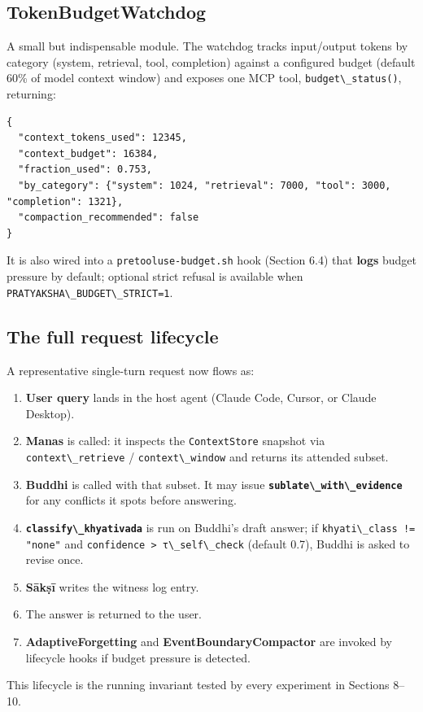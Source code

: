 \subsection{TokenBudgetWatchdog}\label{tokenbudgetwatchdog}

A small but indispensable module. The watchdog tracks input/output tokens by category (system, retrieval, tool, completion) against a configured budget (default 60\% of model context window) and exposes one MCP tool, \passthrough{\lstinline!budget\_status()!}, returning:

\begin{lstlisting}
{
  "context_tokens_used": 12345,
  "context_budget": 16384,
  "fraction_used": 0.753,
  "by_category": {"system": 1024, "retrieval": 7000, "tool": 3000, "completion": 1321},
  "compaction_recommended": false
}
\end{lstlisting}

It is also wired into a \passthrough{\lstinline!pretooluse-budget.sh!} hook (Section 6.4) that \textbf{logs} budget pressure by default; optional strict refusal is available when \passthrough{\lstinline!PRATYAKSHA\_BUDGET\_STRICT=1!}.

\subsection{The full request lifecycle}\label{the-full-request-lifecycle}

A representative single-turn request now flows as:

\begin{enumerate}
\def\labelenumi{\arabic{enumi}.}
\tightlist
\item
  \textbf{User query} lands in the host agent (Claude Code, Cursor, or Claude Desktop).
\item
  \textbf{Manas} is called: it inspects the \passthrough{\lstinline!ContextStore!} snapshot via \passthrough{\lstinline!context\_retrieve!} / \passthrough{\lstinline!context\_window!} and returns its attended subset.
\item
  \textbf{Buddhi} is called with that subset. It may issue \textbf{\passthrough{\lstinline!sublate\_with\_evidence!}} for any conflicts it spots before answering.
\item
  \textbf{\passthrough{\lstinline!classify\_khyativada!}} is run on Buddhi's draft answer; if \passthrough{\lstinline'khyati\_class != "none"'} and \passthrough{\lstinline!confidence > τ\_self\_check!} (default 0.7), Buddhi is asked to revise once.
\item
  \textbf{Sākṣī} writes the witness log entry.
\item
  The answer is returned to the user.
\item
  \textbf{AdaptiveForgetting} and \textbf{EventBoundaryCompactor} are invoked by lifecycle hooks if budget pressure is detected.
\end{enumerate}

This lifecycle is the running invariant tested by every experiment in Sections 8--10.
